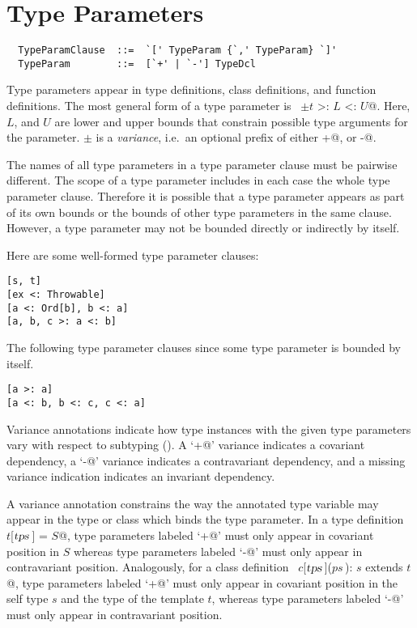\documentclass[a4paper,12pt,twoside,titlepage]{book}
\newcommand{\tps}{\mbox{\sl tps}}
\begin{document}
\section{Type Parameters}

\syntax\begin{lstlisting}
  TypeParamClause  ::=  `[' TypeParam {`,' TypeParam} `]'
  TypeParam        ::=  [`+' | `-'] TypeDcl
\end{lstlisting}


Type parameters appear in type definitions, class definitions, and
function definitions.  The most general form of a type parameter is
~\lstinline@$\pm t$ >: $L$ <: $U$@.  Here, $L$, and $U$ are lower
and upper bounds that constrain possible type arguments for the
parameter. $\pm$ is a {\em variance}, i.e.\ an optional prefix 
of either \lstinline@+@, or \lstinline@-@.

The names of all type parameters in a type parameter clause must be
pairwise different.  The scope of a type parameter includes in each
case the whole type parameter clause. Therefore it is possible that a
type parameter appears as part of its own bounds or the bounds of
other type parameters in the same clause.  However, a type parameter
may not be bounded directly or indirectly by itself.

\example Here are some well-formed type parameter clauses:
\begin{lstlisting}
[s, t]
[ex <: Throwable]
[a <: Ord[b], b <: a]
[a, b, c >: a <: b]
\end{lstlisting}
The following type parameter clauses since some type parameter is bounded by itself.
\begin{lstlisting}
[a >: a]                 
[a <: b, b <: c, c <: a]
\end{lstlisting}

Variance annotations indicate how type instances with the given type
parameters vary with respect to subtyping ().  A
`\lstinline@+@' variance indicates a covariant dependency, a `\lstinline@-@'
variance indicates a contravariant dependency, and a missing variance
indication indicates an invariant dependency.

A variance annotation constrains the way the annotated type variable
may appear in the type or class which binds the type parameter.  In a
type definition ~\lstinline@type $t$[$\tps\,$] = $S$@, type parameters labeled
`\lstinline@+@' must only appear in covariant position in $S$ whereas
type parameters labeled `\lstinline@-@' must only appear in contravariant
position. Analogously, for a class definition
~\lstinline@class $c$[$\tps\,$]($ps\,$): $s$ extends $t$@, type parameters labeled
`\lstinline@+@' must only appear in covariant position in the self type
$s$ and the type of the template $t$, whereas type
parameters labeled `\lstinline@-@' must only appear in contravariant
position. 
\end{document}
